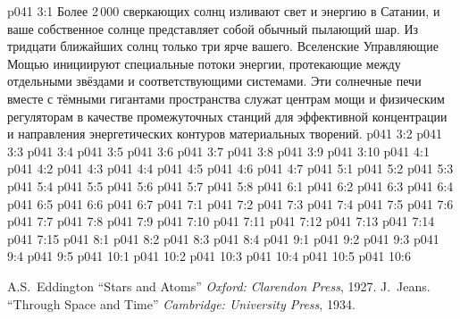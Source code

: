 \vs p041 3:1 Более 2\,000 сверкающих солнц изливают свет и энергию в Сатании, и ваше собственное солнце представляет собой обычный пылающий шар. Из тридцати ближайших солнц только три ярче вашего. Вселенские Управляющие Мощью инициируют специальные потоки энергии, протекающие между отдельными звёздами и соответствующими системами. Эти солнечные печи вместе с тёмными гигантами пространства служат центрам мощи и физическим регуляторам в качестве промежуточных станций для эффективной концентрации и направления энергетических контуров материальных творений.
\vs p041 3:2 
\vs p041 3:3 \pc 
\vs p041 3:4 
\vs p041 3:5 \pc 
\vs p041 3:6 \pc 
\vs p041 3:7 
\vs p041 3:8 \pc 
\vs p041 3:9 
\vs p041 3:10 
\vs p041 4:1 
\vs p041 4:2 \pc 
\vs p041 4:3 \pc 
\vs p041 4:4 
\vs p041 4:5 
\vs p041 4:6 
\vs p041 4:7 
\vs p041 5:1 
\vs p041 5:2 
\vs p041 5:3 
\vs p041 5:4 
\vs p041 5:5 
\vs p041 5:6 \pc 
\vs p041 5:7 \pc 
\vs p041 5:8 
\vs p041 6:1 
\vs p041 6:2 
\vs p041 6:3 \pc 
\vs p041 6:4 
\vs p041 6:5 
\vs p041 6:6 \pc 
\vs p041 6:7 \pc 
{}
\vs p041 7:1 
\vs p041 7:2 
\vs p041 7:3 \pc 
\vs p041 7:4 
\vs p041 7:5 
\vs p041 7:6 
\vs p041 7:7 
\vs p041 7:8 
\vs p041 7:9 
\vs p041 7:10 
\vs p041 7:11 \pc 
\vs p041 7:12 \pc 
\vs p041 7:13 
\vs p041 7:14 \pc 
\vs p041 7:15 
\vs p041 8:1 
\vs p041 8:2 \pc 
\vs p041 8:3 \pc 
\vs p041 8:4 
\vs p041 9:1 
\vs p041 9:2 \pc 
\vs p041 9:3 \pc 
\vs p041 9:4 
\vs p041 9:5 
\vs p041 10:1 
\vs p041 10:2 
\vs p041 10:3 \pc 
\vs p041 10:4 
\vs p041 10:5 \pc 
\vsetoff
\vs p041 10:6 
\quizlink
\begin{thebibliography}{100}
A.S.~Eddington
{``Stars and Atoms''}
{\em Oxford: Clarendon Press}, 1927.
J.~Jeans.
{``Through Space and Time''}
{\em Cambridge: University Press}, 1934.
\end{thebibliography}
